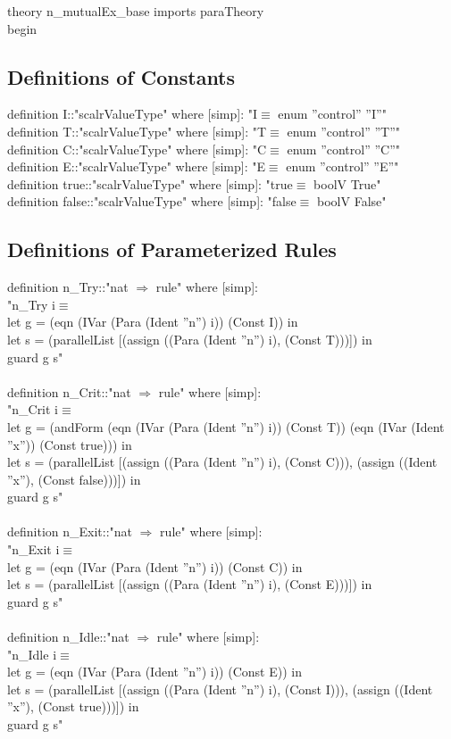 \documentclass{llncs}
\begin{document}
theory n\_mutualEx\_base imports paraTheory\\
begin\\
\subsection{ Definitions of Constants }
definition I::"scalrValueType" where [simp]: "I$\equiv$ enum ''control'' ''I''"\\
definition T::"scalrValueType" where [simp]: "T$\equiv$ enum ''control'' ''T''"\\
definition C::"scalrValueType" where [simp]: "C$\equiv$ enum ''control'' ''C''"\\
definition E::"scalrValueType" where [simp]: "E$\equiv$ enum ''control'' ''E''"\\
definition true::"scalrValueType" where [simp]: "true$\equiv$ boolV True"\\
definition false::"scalrValueType" where [simp]: "false$\equiv$ boolV False"\\
\subsection{  Definitions of Parameterized Rules }
definition n\_Try::"nat $\Rightarrow$ rule" where [simp]:\\
"n\_Try  i$\equiv$\\
let g = (eqn (IVar (Para (Ident ''n'') i)) (Const I)) in\\
let s = (parallelList [(assign ((Para (Ident ''n'') i), (Const T)))]) in\\
guard g s"\\
\\
definition n\_Crit::"nat $\Rightarrow$ rule" where [simp]:\\
"n\_Crit  i$\equiv$\\
let g = (andForm (eqn (IVar (Para (Ident ''n'') i)) (Const T)) (eqn (IVar (Ident ''x'')) (Const true))) in \\
let s = (parallelList [(assign ((Para (Ident ''n'') i), (Const C))), (assign ((Ident ''x''), (Const false)))]) in \\
guard g s"\\
\\
definition n\_Exit::"nat $\Rightarrow$ rule" where [simp]:\\
"n\_Exit  i$\equiv$\\
let g = (eqn (IVar (Para (Ident ''n'') i)) (Const C)) in\\
let s = (parallelList [(assign ((Para (Ident ''n'') i), (Const E)))]) in\\
guard g s"\\
\\
definition n\_Idle::"nat $\Rightarrow$ rule" where [simp]:\\
"n\_Idle  i$\equiv$\\
let g = (eqn (IVar (Para (Ident ''n'') i)) (Const E)) in\\
let s = (parallelList [(assign ((Para (Ident ''n'') i), (Const I))), (assign ((Ident ''x''), (Const true)))]) in\\
guard g s"\\
\end{document}
